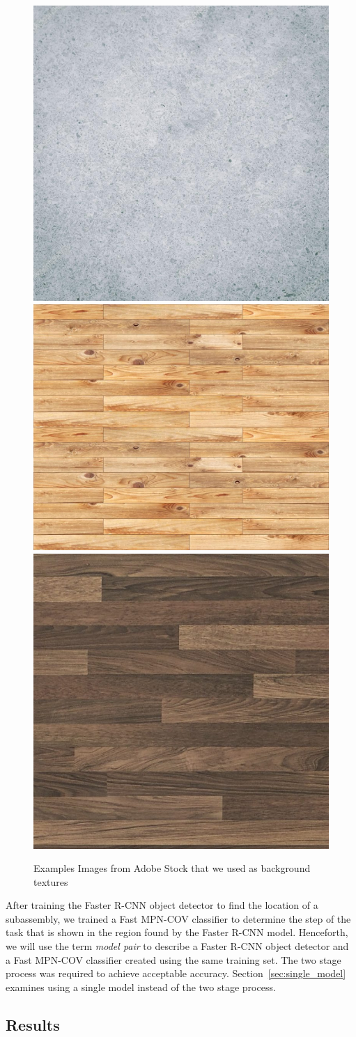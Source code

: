 \begin{figure}
  \includegraphics[width=0.33\columnwidth]{figures/adobe_stock/concrete.jpg}
  \includegraphics[width=0.33\columnwidth]{figures/adobe_stock/wood1.jpg}
  \includegraphics[width=0.33\columnwidth]{figures/adobe_stock/wood2.jpg}
  \caption{
    Examples Images from Adobe Stock that we used as background textures
  }\label{fig:adobe_backgrounds}
\end{figure}

After training the Faster R-CNN object detector to find the location of a
subassembly, we trained a Fast MPN-COV classifier to determine the step of the
task that is shown in the region found by the Faster R-CNN model.
Henceforth, we will use the term \emph{model pair} to describe a Faster R-CNN object
detector and a Fast MPN-COV classifier created using the same training set.
The two stage process was required to achieve acceptable accuracy.
Section~{\ref{sec:single_model}} examines using a single model instead of the
two stage process.

\subsection{Results}

